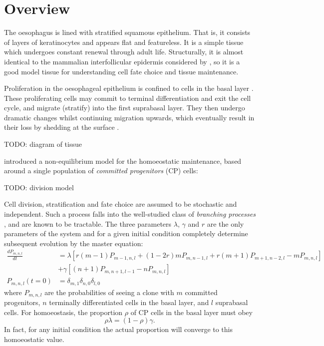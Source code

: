 \documentclass[10pt,english]{report}
\begin{document}
\section{Overview}

The oesophagus is lined with stratified squamous epithelium. That is, it consists of layers of keratinocytes and appears flat and featureless. It is a simple tissue which undergoes constant renewal through adult life. Structurally, it is almost identical to the mammalian interfollicular epidermis considered by \citet{clayton}, so it is a good model tissue for understanding cell fate choice and tissue maintenance.

Proliferation in the oesophageal epithelium is confined to cells in the basal layer \citep{leblond}. These proliferating cells may commit to terminal differentiation and exit the cell cycle, and migrate (stratify) into the first suprabasal layer. They then undergo dramatic changes whilst continuing migration upwards, which eventually result in their loss by shedding at the surface \citep{seery}.

TODO: diagram of tissue

\citet{klein08} introduced a non-equilibrium model for the homoeostatic maintenance, based around a single population of \emph{committed progenitors} (CP) cells:

TODO: division model

Cell division, stratification and fate choice are assumed to be stochastic and independent. Such a process falls into the well-studied class of \emph{branching processes} \citep{athreya&ney}, and are known to be tractable. The three parameters $\lambda$, $\gamma$ and $r$ are the only parameters of the system and for a given initial condition completely determine subsequent evolution by the master equation:
\begin{align}
\nonumber
\frac{dP_{m,n,l}}{dt} &= \lambda\left[r (m-1)P_{m-1,n,l} + (1-2r)mP_{m,n-1,l} + r(m+1)P_{m+1,n-2,l} - mP_{m,n,l}\right] \\
                    &+ \gamma\left[(n+1)P_{m,n+1,l-1} - nP_{m,n,l}\right] \label{eq:ABC-master} \\
\nonumber
P_{m,n,l}(t = 0) &= \delta_{m,1} \delta_{n,0} \delta_{l,0}
\end{align}
where $P_{m,n,l}$ are the probabilities of seeing a clone with $m$ committed progenitors, $n$ terminally differentiated cells in the basal layer, and $l$ suprabasal cells. For homoeostasis, the proportion $\rho$ of CP cells in the basal layer must obey
\begin{equation}
\rho \lambda = (1-\rho) \gamma.\label{eq:homoeostatic-rho}
\end{equation}
In fact, for any initial condition the actual proportion will converge to this homoeostatic value.
\end{document}
